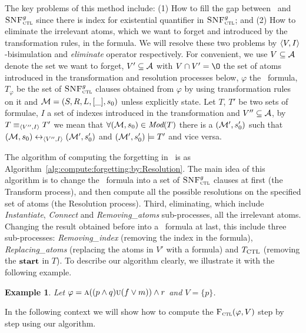 \documentclass{article}
\newtheorem{example}{Example}
\begin{document}
The key problems of this method include: (1) How to fill the gap between \CTL\ and ${\textsc{SNF}_{\textsc{ctl}}^g}$ since there is index for existential quantifier in ${\textsc{SNF}_{\textsc{ctl}}^g}$; and (2) How to eliminate the irrelevant atoms, which we want to forget and introduced by the transformation rules, in the formula.
We will resolve these two problems by ${\langle{V,I}\rangle}$-bisimulation and \emph{eliminate} operator respectively.
For convenient, we use $V\subseteq {\cal A}$ denote the set we want to forget, $V' \subseteq {\cal A}$ with $V \cap V'={\O}$ the set of atoms introduced in the transformation and resolution processes below, $\varphi$  the \CTL\ formula, $T_{\varphi}$ be the set of ${\textsc{SNF}_{\textsc{ctl}}^g}$ clauses obtained from $\varphi$ by using transformation rules on it and ${\cal M}=(S,R,L,[\_], s_0)$ unless explicitly state.
 Let $T$, $T'$ be two sets of formulae, $I$ a set of indexes introduced in the transformation and $V''\subseteq {\cal A}$, by $T\equiv_{{\langle{V'', I}\rangle}} T'$ we mean that $\forall ({\cal M}, s_0) \in \textit{Mod}(T)$ there is a $({\cal M}', s_0')$ such that $({\cal M},s_0) \leftrightarrow_{{\langle{V'', I}\rangle}} ({\cal M}',s_0')$ and $({\cal M}', s_0') \models T'$ and vice versa.







The algorithm of computing the forgetting in \CTL\ is as Algorithm~\ref{alg:compute:forgetting:by:Resolution}.
The main idea of this algorithm is to change the \CTL\ formula into a set of ${\textsc{SNF}_{\textsc{ctl}}^g}$ clauses at first (the Transform process), and then compute all the possible resolutions on the specified set of atoms (the Resolution process). Third, eliminating, which include \emph{Instantiate}, \emph{Connect} and \emph{Removing\_atoms} sub-processes, all the irrelevant atoms. %
Changing the result obtained before into a \CTL\ formula at last, this include three sub-processes: \emph{Removing\_index} (removing the index in the formula), \emph{Replacing\_atoms} (replacing the atoms in $V'$ with a formula) and $T_{\textrm{CTL}}$ (removing the $\textbf{start}$ in $T$).
To describe our algorithm clearly, we illustrate it with the following example.
\begin{example}\label{main:examp}
Let $\varphi=\textsc{a}((p\wedge q) \textsc{u} (f\vee m)) \wedge r$ and $V=\{p\}$.
\end{example}
In the following context we will show how to compute the ${\textsc{F}_{\textsc{ctl}}}(\varphi, V)$ step by step using our algorithm.
\end{document}
